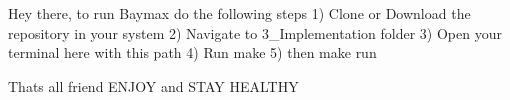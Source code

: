 Hey there, to run Baymax do the following steps 1) Clone or Download the repository in your system 2) Navigate to 3\+\_\+\+Implementation folder 3) Open your terminal here with this path 4) Run {\ttfamily make} 5) then {\ttfamily make run}



That\textquotesingle{}s all friend ENJOY and STAY HEALTHY 